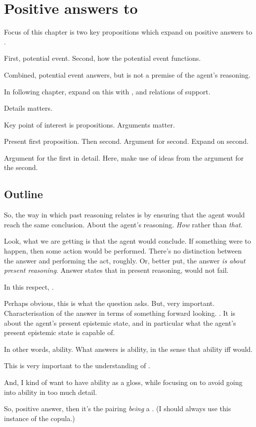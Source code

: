 \chapter{Positive answers to \qzS{}}
\label{cha:positive-answers}

\begin{note}
  Focus of this chapter is two key propositions which expand on positive answers to \qzS{}.

  First, potential event.
  Second, how the potential event functions.

  Combined, potential event answers, but is not a premise of the agent's reasoning.

  In following chapter, expand on this with , and relations of support.
\end{note}

\begin{note}
  Details matters.

  Key point of interest is propositions.
  Arguments matter.

  Present first proposition.
  Then second.
  Argument for second.
  Expand on second.

  Argument for the first in detail.
  Here, make use of ideas from the argument for the second.
\end{note}

\section{Outline}
\label{sec:outline}

\begin{note}
  So, the way in which past reasoning relates is by ensuring that the agent would reach the same conclusion.
  About the agent's reasoning.
  \emph{How} rather than \emph{that}.

  Look, what we are getting is that the agent would conclude.
  If something were to happen, then some action would be performed.
  There's no distinction between the answer and performing the act, roughly.
  Or, better put, the answer \emph{is about present reasoning}.
  Answer states that in present reasoning, would not fail.

  In this respect, \fc{}.

  Perhaps obvious, this is what the question asks.
  But, very important.
  Characterisation of the answer in terms of something forward looking.
  \fc{}.
  It is about the agent's present epistemic state, and in particular what the agent's present epistemic state is capable of.

  In other words, ability.
  What answers is ability, in the sense that ability iff would.

  This is very important to the understanding of \fc{}.

  And, I kind of want to have ability as a gloss, while focusing on \fc{} to avoid going into ability in too much detail.

  So, positive answer, then it's the pairing \emph{being} a \fc{}.
  (I should always use this instance of the copula.)
\end{note}

